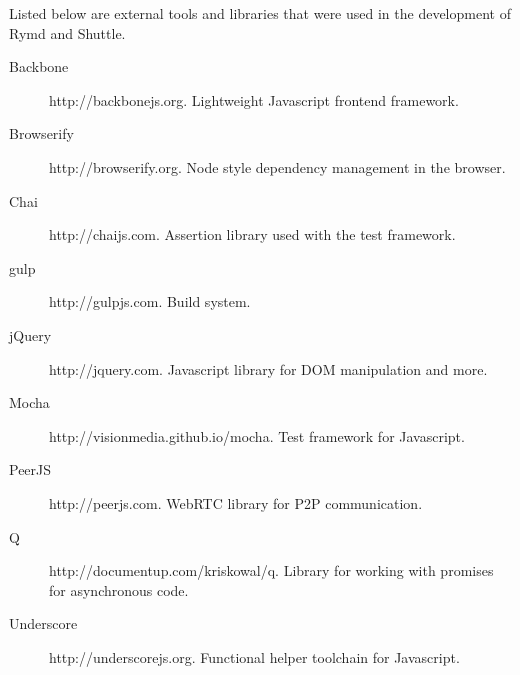 Listed below are external tools and libraries that were used in the development of Rymd and Shuttle.

\begin{description}
  \item[Backbone] http://backbonejs.org. Lightweight Javascript frontend framework.
  \item[Browserify] http://browserify.org. Node style dependency management in the browser.
  \item[Chai] http://chaijs.com. Assertion library used with the test framework.
  \item[gulp] http://gulpjs.com. Build system.
  \item[jQuery] http://jquery.com. Javascript library for DOM manipulation and more.
  \item[Mocha] http://visionmedia.github.io/mocha. Test framework for Javascript.
  \item[PeerJS] http://peerjs.com. WebRTC library for P2P communication.
  \item[Q] http://documentup.com/kriskowal/q. Library for working with promises for asynchronous code.
  \item[Underscore] http://underscorejs.org. Functional helper toolchain for Javascript.
\end{description}
